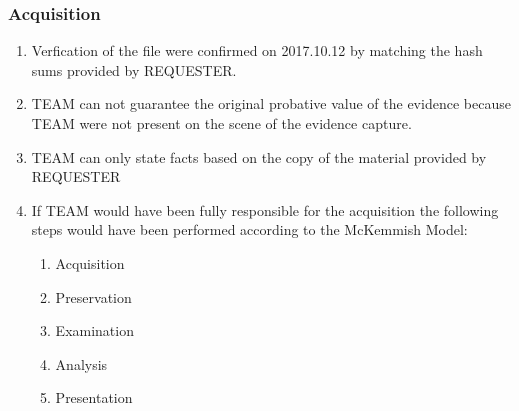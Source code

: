 \subsubsection{Acquisition}
\begin{enumerate}
\item Verfication of the file were confirmed on 2017.10.12 by matching the hash sums provided by REQUESTER.
\item TEAM can not guarantee the original probative value of the evidence because TEAM were not present on the scene of
	the evidence capture.
\item TEAM can only state facts based on the copy of the material provided by REQUESTER
\item If TEAM would have been fully responsible for the acquisition the following steps would have been
	performed according to the McKemmish Model:
	\begin{enumerate}[label=\alph*]
		\item Acquisition
		\item Preservation
		\item Examination
		\item Analysis
		\item Presentation
	\end{enumerate}
\end{enumerate}
